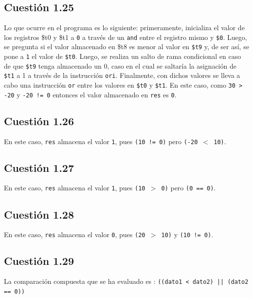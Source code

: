 \documentclass[11pt]{article}
\begin{document}
\begin{large}
\begin{flushleft}
\begin{listing}[h]
\begin{verbatim}
\end{verbatim}
\end{listing}


\subsection*{Cuestión 1.25}
Lo que ocurre en el programa es lo siguiente: primeramente, inicializa el valor de los registros \$t0 y \$t1 a \texttt{0} a través de un \texttt{and} entre el registro mismo y \texttt{\$0}. Luego, se pregunta si el valor almacenado en \$t8 es menor al valor en \texttt{\$t9} y, de ser así, se pone a \texttt{1} el valor de \texttt{\$t0}. Luego, se realiza un salto de rama condicional en caso de que \texttt{\$t9} tenga almacenado un 0, caso en el cual se saltaría la asignación de \texttt{\$t1} a 1 a través de la instrucción \texttt{ori}. Finalmente, con dichos valores se lleva a cabo una instrucción \texttt{or} entre los valores en \texttt{\$t0} y \texttt{\$t1}. En este caso, como \texttt{30 > -20} y \texttt{-20 != 0} entonces el valor almacenado en \texttt{res} es \texttt{0}.



\subsection*{Cuestión 1.26}
En este caso, \texttt{res} almacena el valor \texttt{1}, pues \texttt{(10 != 0)} pero \texttt{(-20 $<$ 10)}. 



\subsection*{Cuestión 1.27}
En este caso, \texttt{res} almacena el valor \texttt{1}, pues \texttt{(10 $>$ 0)} pero \texttt{(0 == 0)}. 


\subsection*{Cuestión 1.28}
En este caso, \texttt{res} almacena el valor \texttt{0}, pues \texttt{(20 $>$ 10)} y \texttt{(10 != 0)}. 


\subsection*{Cuestión 1.29}
La comparación compuesta que se ha evaluado es : \texttt{((dato1 < dato2) || (dato2 == 0))}


\end{flushleft}
\end{large}
\end{document}
